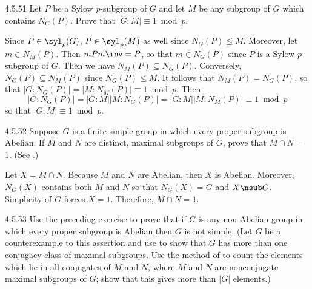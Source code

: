 \begin{exercise}{4.5.51}
	Let $P$ be a Sylow $p$-subgroup of $G$ and let $M$ be any subgroup of $G$ which contains $N_G(P)$.
	Prove that $|G : M| \equiv 1 \bmod p$.
\end{exercise}

\begin{sol}
	Since $P \in \syl_p(G)$, $P \in \syl_p(M)$ as well since $N_G(P) \leq M$.
	Moreover, let $m \in N_M(P)$.
	Then $mPm\inv = P$, so that $m \in N_G(P)$ since $P$ is a Sylow $p$-subgroup of $G$.
	Then we have $N_M(P) \subseteq N_G(P)$.
	Conversely, $N_G(P) \subseteq N_M(P)$ since $N_G(P) \leq M$.
	It follows that $N_M(P) = N_G(P)$, so that $|G : N_G(P)| = |M : N_M(P)| \equiv 1 \bmod p$.
	Then
	\[
		|G : N_G(P)| = |G : M||M : N_G(P)| = |G : M||M : N_M(P)| \equiv 1 \bmod p
	\]
	so that $|G : M| \equiv 1 \bmod p$.
\end{sol}

\begin{exercise}{4.5.52}
	Suppose $G$ is a finite simple group in which every proper subgroup is Abelian.
	If $M$ and $N$ are distinct, maximal subgroups of $G$, prove that $M \cap N$ = 1. (See .)
\end{exercise}

\begin{sol}
	Let $X = M \cap N$.
	Because $M$ and $N$ are Abelian, then $X$ is Abelian.
	Moreover, $N_G(X)$ contains both $M$ and $N$ so that $N_G(X) = G$ and $X \nsub G$.
	Simplicity of $G$ forces $X = 1$.
	Therefore, $M \cap N = 1$.
\end{sol}

\begin{exercise}{4.5.53}
	Use the preceding exercise to prove that if $G$ is any non-Abelian group in which every proper subgroup is Abelian then $G$ is not simple. (Let $G$ be a counterexample to this assertion and use  to show that $G$ has more than one conjugacy class of maximal subgroups.
	Use the method of  to count the elements which lie in all conjugates of $M$ and $N$, where $M$ and $N$ are nonconjugate maximal subgroups of $G$; show that this gives more than $|G|$ elements.)
\end{exercise}

